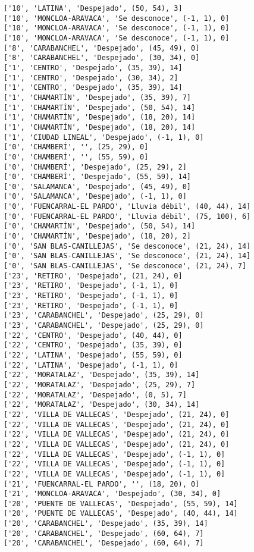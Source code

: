 \documentclass[11pt]{article}
\begin{document}
\begin{Verbatim}[commandchars=\\\{\}]
['10', 'LATINA', 'Despejado', (50, 54), 3]
['10', 'MONCLOA-ARAVACA', 'Se desconoce', (-1, 1), 0]
['10', 'MONCLOA-ARAVACA', 'Se desconoce', (-1, 1), 0]
['10', 'MONCLOA-ARAVACA', 'Se desconoce', (-1, 1), 0]
['8', 'CARABANCHEL', 'Despejado', (45, 49), 0]
['8', 'CARABANCHEL', 'Despejado', (30, 34), 0]
['1', 'CENTRO', 'Despejado', (35, 39), 14]
['1', 'CENTRO', 'Despejado', (30, 34), 2]
['1', 'CENTRO', 'Despejado', (35, 39), 14]
['1', 'CHAMARTÍN', 'Despejado', (35, 39), 7]
['1', 'CHAMARTÍN', 'Despejado', (50, 54), 14]
['1', 'CHAMARTÍN', 'Despejado', (18, 20), 14]
['1', 'CHAMARTÍN', 'Despejado', (18, 20), 14]
['1', 'CIUDAD LINEAL', 'Despejado', (-1, 1), 0]
['0', 'CHAMBERÍ', '', (25, 29), 0]
['0', 'CHAMBERÍ', '', (55, 59), 0]
['0', 'CHAMBERÍ', 'Despejado', (25, 29), 2]
['0', 'CHAMBERÍ', 'Despejado', (55, 59), 14]
['0', 'SALAMANCA', 'Despejado', (45, 49), 0]
['0', 'SALAMANCA', 'Despejado', (-1, 1), 0]
['0', 'FUENCARRAL-EL PARDO', 'Lluvia débil', (40, 44), 14]
['0', 'FUENCARRAL-EL PARDO', 'Lluvia débil', (75, 100), 6]
['0', 'CHAMARTÍN', 'Despejado', (50, 54), 14]
['0', 'CHAMARTÍN', 'Despejado', (18, 20), 2]
['0', 'SAN BLAS-CANILLEJAS', 'Se desconoce', (21, 24), 14]
['0', 'SAN BLAS-CANILLEJAS', 'Se desconoce', (21, 24), 14]
['0', 'SAN BLAS-CANILLEJAS', 'Se desconoce', (21, 24), 7]
['23', 'RETIRO', 'Despejado', (21, 24), 0]
['23', 'RETIRO', 'Despejado', (-1, 1), 0]
['23', 'RETIRO', 'Despejado', (-1, 1), 0]
['23', 'RETIRO', 'Despejado', (-1, 1), 0]
['23', 'CARABANCHEL', 'Despejado', (25, 29), 0]
['23', 'CARABANCHEL', 'Despejado', (25, 29), 0]
['22', 'CENTRO', 'Despejado', (40, 44), 0]
['22', 'CENTRO', 'Despejado', (35, 39), 0]
['22', 'LATINA', 'Despejado', (55, 59), 0]
['22', 'LATINA', 'Despejado', (-1, 1), 0]
['22', 'MORATALAZ', 'Despejado', (35, 39), 14]
['22', 'MORATALAZ', 'Despejado', (25, 29), 7]
['22', 'MORATALAZ', 'Despejado', (0, 5), 7]
['22', 'MORATALAZ', 'Despejado', (30, 34), 14]
['22', 'VILLA DE VALLECAS', 'Despejado', (21, 24), 0]
['22', 'VILLA DE VALLECAS', 'Despejado', (21, 24), 0]
['22', 'VILLA DE VALLECAS', 'Despejado', (21, 24), 0]
['22', 'VILLA DE VALLECAS', 'Despejado', (21, 24), 0]
['22', 'VILLA DE VALLECAS', 'Despejado', (-1, 1), 0]
['22', 'VILLA DE VALLECAS', 'Despejado', (-1, 1), 0]
['22', 'VILLA DE VALLECAS', 'Despejado', (-1, 1), 0]
['21', 'FUENCARRAL-EL PARDO', '', (18, 20), 0]
['21', 'MONCLOA-ARAVACA', 'Despejado', (30, 34), 0]
['20', 'PUENTE DE VALLECAS', 'Despejado', (55, 59), 14]
['20', 'PUENTE DE VALLECAS', 'Despejado', (40, 44), 14]
['20', 'CARABANCHEL', 'Despejado', (35, 39), 14]
['20', 'CARABANCHEL', 'Despejado', (60, 64), 7]
['20', 'CARABANCHEL', 'Despejado', (60, 64), 7]

\end{Verbatim}
\end{document}
